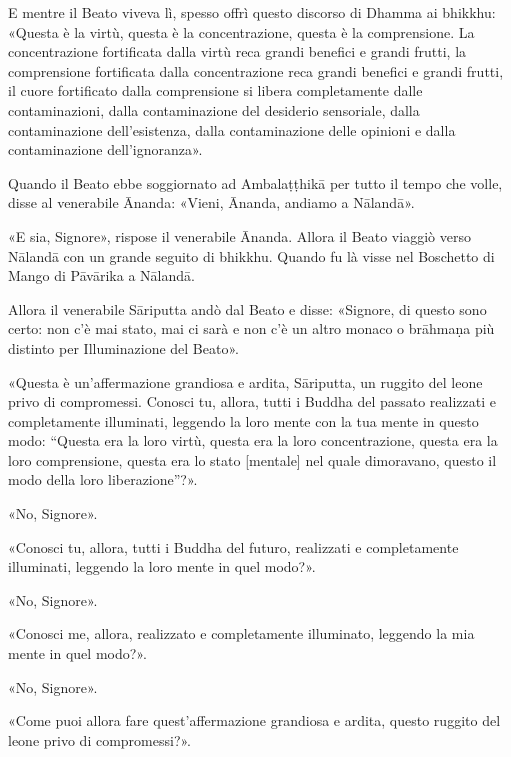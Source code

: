 E mentre il Beato viveva lì, spesso offrì questo discorso di Dhamma ai bhikkhu:
«Questa è la virtù, questa è la concentrazione, questa è la comprensione. La
concentrazione fortificata dalla virtù reca grandi benefici e grandi frutti, la
comprensione fortificata dalla concentrazione reca grandi benefici e grandi
frutti, il cuore fortificato dalla comprensione si libera completamente dalle
contaminazioni, dalla contaminazione del desiderio sensoriale, dalla
contaminazione dell’esistenza, dalla contaminazione delle opinioni e dalla
contaminazione dell’ignoranza».

Quando il Beato ebbe soggiornato ad Ambalaṭṭhikā per tutto il tempo che volle,
disse al venerabile Ānanda: «Vieni, Ānanda, andiamo a Nālandā».

«E sia, Signore», rispose il venerabile Ānanda. Allora il Beato viaggiò verso
Nālandā con un grande seguito di bhikkhu. Quando fu là visse nel Boschetto di
Mango di Pāvārika a Nālandā.


Allora il venerabile Sāriputta andò dal Beato e disse: «Signore, di questo sono
certo: non c’è mai stato, mai ci sarà e non c’è un altro monaco o brāhmaṇa più
distinto per Illuminazione del Beato».

«Questa è un’affermazione grandiosa e ardita, Sāriputta, un ruggito del leone
privo di compromessi. Conosci tu, allora, tutti i Buddha del passato realizzati
e completamente illuminati, leggendo la loro mente con la tua mente in questo
modo: “Questa era la loro virtù, questa era la loro concentrazione, questa era
la loro comprensione, questa era lo stato [mentale] nel quale dimoravano, questo
il modo della loro liberazione”?».

«No, Signore».

«Conosci tu, allora, tutti i Buddha del futuro, realizzati e completamente
illuminati, leggendo la loro mente in quel modo?».

«No, Signore».

«Conosci me, allora, realizzato e completamente illuminato, leggendo la mia
mente in quel modo?».

«No, Signore».

«Come puoi allora fare quest’affermazione grandiosa e ardita, questo ruggito del
leone privo di compromessi?».

